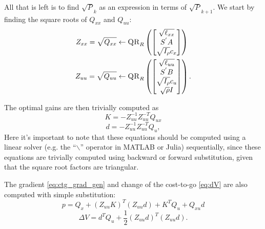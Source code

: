 \documentclass[../root.tex]{subfiles}
\begin{document}
All that is left is to find $\sqrt{P}_k$ as an expression in terms of
$\sqrt{P}_{k+1}$. We start by finding the square roots of $Q_{xx}$ and
$Q_{uu}$:
\begin{align} 
	Z_{xx} = \sqrt{Q_{xx}} &\leftarrow \textproc{QR}_R \left( 
		\begin{bmatrix} \sqrt{\ell_{xx}} \\ S^{'} A \\ \sqrt{I_\rho} c_x  \end{bmatrix} \right) \label{Qxx_sqrt} \\
    Z_{uu} = \sqrt{Q_{uu}} &\leftarrow \textproc{QR}_R \left(
    	\begin{bmatrix} \sqrt{\ell_{uu}} \\ S^{'} B \\ \sqrt{I_\rho} c_u \\
    	\sqrt{\rho} I \end{bmatrix} \label{Quu_sqrt} \right).
\end{align}

The optimal gains are then trivially computed as
\begin{equation} \label{sqrt_K}
	K = -Z_{uu}^{-1} Z_{uu}^{-T} Q_{ux}
\end{equation}
\begin{equation} \label{sqrt_d}
	d = -Z_{uu}^{-1} Z_{uu}^{-T}Q_u,
\end{equation}
Here it's important to note that these equations should be computed using a
linear solver (e.g. the ``$\backslash$'' operator in MATLAB or Julia)
sequentially, since these equations are trivially computed using backward or
forward substitution, given that the square root factors are triangular.

The gradient \eqref{eq:ctg_grad_gen} and change of the cost-to-go
\eqref{eq:dV} are also computed with simple substitution:
\begin{equation}
	p = Q_x + (Z_{uu}K)^T(Z_{uu}d) + K^T Q_u + Q_{xu}d \label{ctg_grad_sqrt}
\end{equation}
\begin{equation}
    \Delta V = d^T Q_u + \frac{1}{2}(Z_{uu}d)^T (Z_{uu}d) \label{dV_sqrt}.
\end{equation}
\end{document}
